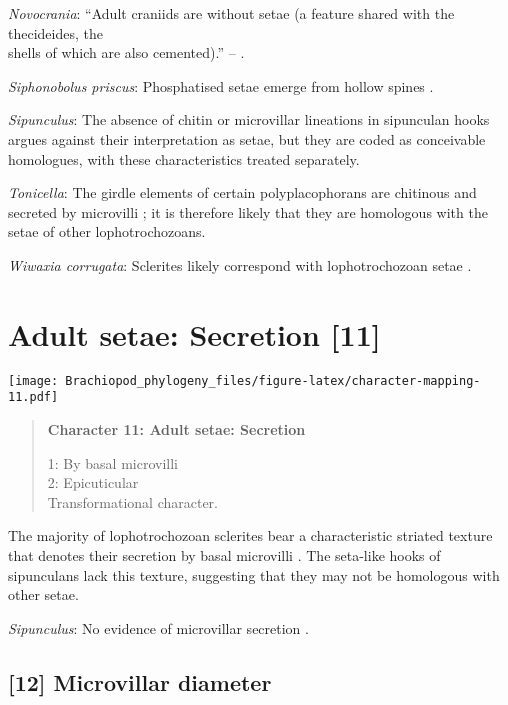 \documentclass[openany]{book}
\theoremstyle{definition}
\theoremstyle{definition}
\theoremstyle{definition}
\theoremstyle{remark}
\begin{document}
\hypertarget{Novocrania-coding-10}{}
\emph{Novocrania}: ``Adult craniids are without setae (a feature shared
with the thecideides, the\\
shells of which are also cemented).'' -- \citet{Williams2007Supplement}.

\hypertarget{Siphonobolus_priscus-coding-10}{}
\emph{Siphonobolus priscus}: Phosphatised setae emerge from hollow
spines \citep{Popov2009Earlyontogeny}.

\hypertarget{Sipunculus-coding-10}{}
\emph{Sipunculus}: The absence of chitin or microvillar lineations in
sipunculan hooks argues against their interpretation as setae, but they
are coded as conceivable homologues, with these characteristics treated
separately.

\hypertarget{Tonicella-coding-10}{}
\emph{Tonicella}: The girdle elements of certain polyplacophorans are
chitinous and secreted by microvilli
\citep{Fischer1980, Leise1982, Leise1988}; it is therefore likely that
they are homologous with the setae of other lophotrochozoans.

\hypertarget{Wiwaxia_corrugata-coding-10}{}
\emph{Wiwaxia corrugata}: Sclerites likely correspond with
lophotrochozoan setae \citep{Butterfield1990, Smith2014, Zhang2015}.

\section{Adult setae: Secretion
{[}11{]}}\label{adult-setae-secretion-11}

\texttt{[image: Brachiopod\_phylogeny\_files/figure-latex/character-mapping-11.pdf]}

\begin{quote}
\textbf{Character 11: Adult setae: Secretion}

1: By basal microvilli\\
2: Epicuticular\\
Transformational character.
\end{quote}

The majority of lophotrochozoan sclerites bear a characteristic striated
texture that denotes their secretion by basal microvilli
\citep{Butterfield1990}. The seta-like hooks of sipunculans lack this
texture, suggesting that they may not be homologous with other setae.

\hypertarget{Sipunculus-coding-11}{}
\emph{Sipunculus}: No evidence of microvillar secretion
\citep[e.g.][]{Schulze2005}.

\subsection*{{[}12{]} Microvillar diameter}\label{microvillar-diameter}
\end{document}
